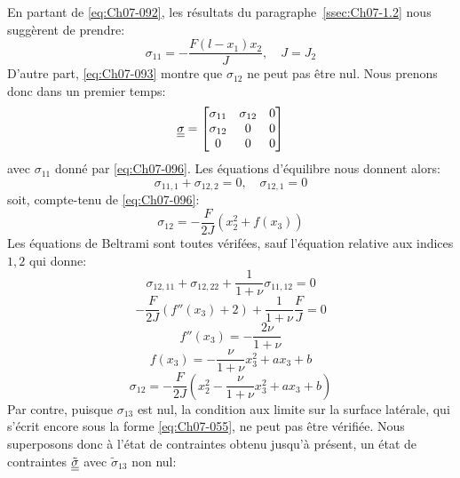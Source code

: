 En partant de \eqref{eq:Ch07-092}, les résultats du paragraphe~\ref{ssec:Ch07-1.2} nous suggèrent de prendre:
\begin{equation}
    \sigma_{11} = - \frac{F\left( l - x_1 \right)x_2}{J},\quad J = J_2
    \label{eq:Ch07-096}
\end{equation}
D'autre part, \eqref{eq:Ch07-093} montre que $\sigma_{12}$ ne peut pas être nul.
Nous prenons donc dans un premier temps:
\begin{equation}
    \underline{\underline{\sigma}} = 
    \begin{bmatrix}
        \sigma_{11} & \sigma_{12} & 0 \\
        \sigma_{12} & 0 & 0 \\
        0 & 0 & 0
    \end{bmatrix}
    \label{eq:Ch07-097}
\end{equation}
avec $\sigma_{11}$ donné par \eqref{eq:Ch07-096}.
Les équations d'équilibre nous donnent alors:
\begin{displaymath}
    \sigma_{11,1} + \sigma_{12,2} = 0 ,\quad \sigma_{12,1} = 0
\end{displaymath}
soit, compte-tenu de \eqref{eq:Ch07-096}: 
\begin{equation}
    \sigma_{12} = -\frac{F}{2J} ( x_2^2 + f(x_3) )
    \label{eq:Ch07-098}
\end{equation}
Les équations de Beltrami sont toutes vérifées, sauf l'équation relative aux indices $1,2$ qui donne: 
\begin{displaymath}
    \sigma_{12,11}+\sigma_{12,22} + \frac{1}{1+\nu} \sigma_{11,12} = 0 
\end{displaymath}
\begin{displaymath}
    -\frac{F}{2J} \left( f''(x_3) + 2 \right) + \frac{1}{1+\nu} \frac{F}{J} = 0
\end{displaymath}
\begin{displaymath}
    f''(x_3)= -\frac{2\nu}{1+\nu}
\end{displaymath}
\begin{displaymath}
f(x_3) = - \frac{\nu}{1+\nu} x_3^2 + a x_3 + b
\end{displaymath}
\begin{equation}
    \sigma_{12} = - \frac{F}{2J} \left( x_2^2 - \frac{\nu}{1+\nu} x_3^2 + ax_3 +b\right)
    \label{eq:Ch07-099}
\end{equation}
Par contre, puisque $\sigma_{13}$ est nul, la condition aux limite sur la surface latérale, qui s'écrit encore sous la forme \eqref{eq:Ch07-055}, ne peut pas être vérifiée.
Nous superposons donc à l'état de contraintes obtenu jusqu'à présent, un état de contraintes $\tilde{\underline{\underline{\sigma}}}$ avec $\tilde{\sigma}_{13}$ non nul:

